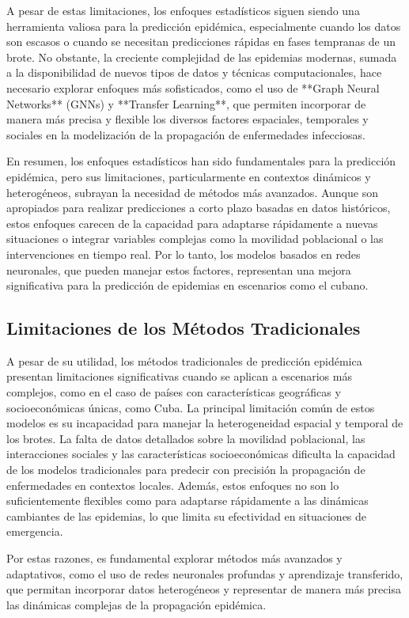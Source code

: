 A pesar de estas limitaciones, los enfoques estadísticos siguen siendo una herramienta valiosa para la predicción epidémica, especialmente cuando los datos son escasos o cuando se necesitan predicciones rápidas en fases tempranas de un brote. No obstante, la creciente complejidad de las epidemias modernas, sumada a la disponibilidad de nuevos tipos de datos y técnicas computacionales, hace necesario explorar enfoques más sofisticados, como el uso de **Graph Neural Networks** (GNNs) y **Transfer Learning**, que permiten incorporar de manera más precisa y flexible los diversos factores espaciales, temporales y sociales en la modelización de la propagación de enfermedades infecciosas.

En resumen, los enfoques estadísticos han sido fundamentales para la predicción epidémica, pero sus limitaciones, particularmente en contextos dinámicos y heterogéneos, subrayan la necesidad de métodos más avanzados. Aunque son apropiados para realizar predicciones a corto plazo basadas en datos históricos, estos enfoques carecen de la capacidad para adaptarse rápidamente a nuevas situaciones o integrar variables complejas como la movilidad poblacional o las intervenciones en tiempo real. Por lo tanto, los modelos basados en redes neuronales, que pueden manejar estos factores, representan una mejora significativa para la predicción de epidemias en escenarios como el cubano.

\subsection{Limitaciones de los Métodos Tradicionales}

A pesar de su utilidad, los métodos tradicionales de predicción epidémica presentan limitaciones significativas cuando se aplican a escenarios más complejos, como en el caso de países con características geográficas y socioeconómicas únicas, como Cuba. La principal limitación común de estos modelos es su incapacidad para manejar la heterogeneidad espacial y temporal de los brotes. La falta de datos detallados sobre la movilidad poblacional, las interacciones sociales y las características socioeconómicas dificulta la capacidad de los modelos tradicionales para predecir con precisión la propagación de enfermedades en contextos locales. Además, estos enfoques no son lo suficientemente flexibles como para adaptarse rápidamente a las dinámicas cambiantes de las epidemias, lo que limita su efectividad en situaciones de emergencia.

Por estas razones, es fundamental explorar métodos más avanzados y adaptativos, como el uso de redes neuronales profundas y aprendizaje transferido, que permitan incorporar datos heterogéneos y representar de manera más precisa las dinámicas complejas de la propagación epidémica.
